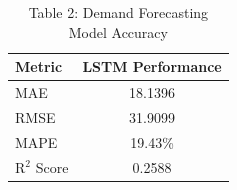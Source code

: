 
\begin{table}[h]
\centering
\begin{tabular}{|l|c|}
\hline
\textbf{Metric} & \textbf{LSTM Performance} \\
\hline
MAE & 18.1396 \\
RMSE & 31.9099 \\
MAPE & 19.43\% \\
R$^2$ Score & 0.2588 \\
\hline
\end{tabular}
\caption{Table 2: Demand Forecasting Model Accuracy}
\end{table}
